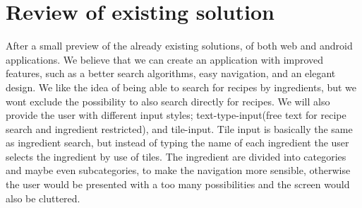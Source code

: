 \section{Review of existing solution}
After a small preview of the already existing solutions, of both web and android applications. We believe that we can create an application with improved features, such as a better search algorithms, easy navigation, and an elegant design. We like the idea of being able to search for recipes by ingredients, but we wont exclude the possibility to also search directly for recipes. We will also provide the user with different input styles; text-type-input(free text for recipe search and ingredient restricted), and tile-input. Tile input is basically the same as ingredient search, but instead of typing the name of each ingredient the user selects the ingredient by use of tiles. The ingredient are divided into categories and maybe even subcategories, to make the navigation more sensible, otherwise the user would be presented with a too many possibilities and the screen would also be cluttered.  
